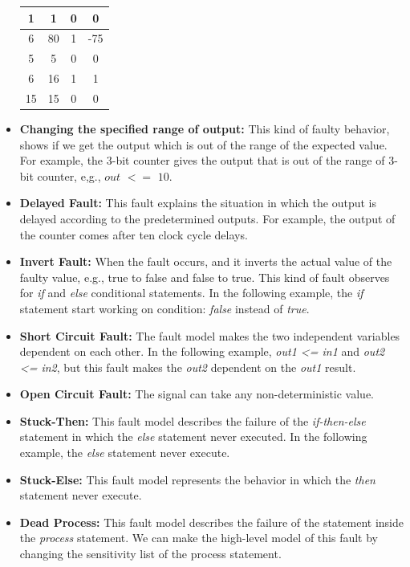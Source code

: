 \begin{itemize}
\begin{table}[tb!]
{\begin{tabular}{|c|c|c|c|}
 
 1& 1 & 0 & 0  \\
 \hline
 6 & 80 & 1 & -75 \\ 
 \hline
 
 5 & 5 & 0 & 0 \\
 \hline
 6& 16& 1& 1 \\
 \hline
 15 & 15  &  0& 0 \\
 \hline
 
 
\end{tabular}
}
\end{table}
\item \textbf{Changing the specified range of output:} This kind of faulty behavior, shows if we get the output which is out of the range of the expected value. For example, the 3-bit counter gives the output that is out of the range of 3-bit counter, e,g., $out$ $<=$ $10$.
\item \textbf{Delayed Fault:} This fault explains the situation in which the output is delayed according to the predetermined outputs. For example, the output of the counter comes after ten clock cycle delays.
\item \textbf{Invert Fault:} When the fault occurs, and it inverts the actual value of the faulty value, e.g., true to false and false to true. This kind of fault observes for \textit{if} and \textit{else}
conditional statements. In the following example, the \textit{if} statement start working on condition: \textit{false} instead of \textit{true}.

\item \textbf{Short Circuit Fault:} The fault model makes the two independent variables dependent on each other. In the following example, \textit{out1 <= in1} and \textit{out2 <= in2}, but this fault makes the \textit{out2} dependent on the \textit{out1} result.

\item \textbf{Open Circuit Fault:} The signal can take any non-deterministic value.

\item \textbf{Stuck-Then:} This fault model describes the failure of the \textit{if-then-else} statement in which the \textit{else}
 statement never executed. In the following example, the \textit{else }
statement never execute.

\item \textbf{Stuck-Else:} This fault model represents the behavior in which the \textit{then} statement never execute.

\item \textbf{Dead Process:} This fault model describes the failure of the statement inside the \textit{process} statement. We can make the high-level model of this fault by changing the sensitivity list of the process statement.


\end{itemize}
